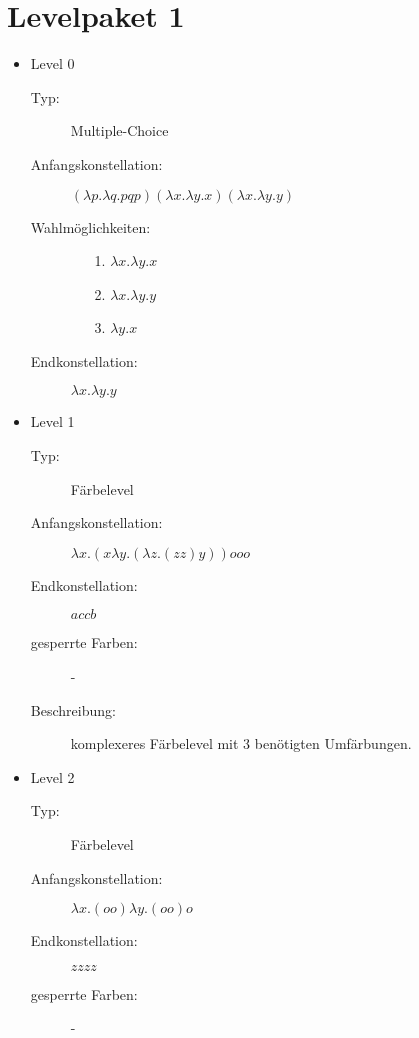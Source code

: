 \section{Levelpaket 1}
\begin{itemize}

	\item{Level 0}
		\begin{description}
			\item[Typ:] Multiple-Choice 
			\item[Anfangskonstellation:] \((\lambda p .\lambda q . p q p ) (\lambda x . \lambda y . x ) (\lambda x . \lambda y . y )  \)    
			\item[Wahlmöglichkeiten:] \hfill
				\begin{itemize}
					\item[1.] \(\lambda x . \lambda y . x \) 
					\item[2.] \(\lambda x . \lambda y . y \)
					\item[3.] \(\lambda y . x \)
				\end{itemize}
			\item[Endkonstellation:]\(\lambda x . \lambda y . y \)
		\end{description}

	\item{Level 1}
		\begin{description} 
		\item[Typ:] Färbelevel 
		\item[Anfangskonstellation:] \(\lambda x . ( x \lambda y .  ( \lambda z . (z z) y )  )  o o o\)   
		\item[Endkonstellation:] \(a c c b\) 
		\item[gesperrte Farben:] -
		\item[Beschreibung:] komplexeres Färbelevel mit 3 benötigten Umfärbungen. 

		\end{description}
	
	\item{Level 2}
		\begin{description}
			\item[Typ:] Färbelevel
			\item[Anfangskonstellation:] \( \lambda x . ( o o ) \lambda y . ( o o ) o \)    
			\item[Endkonstellation:] \(z z z z\)
			\item[gesperrte Farben:] -
		\end{description}
			
\end{itemize}
